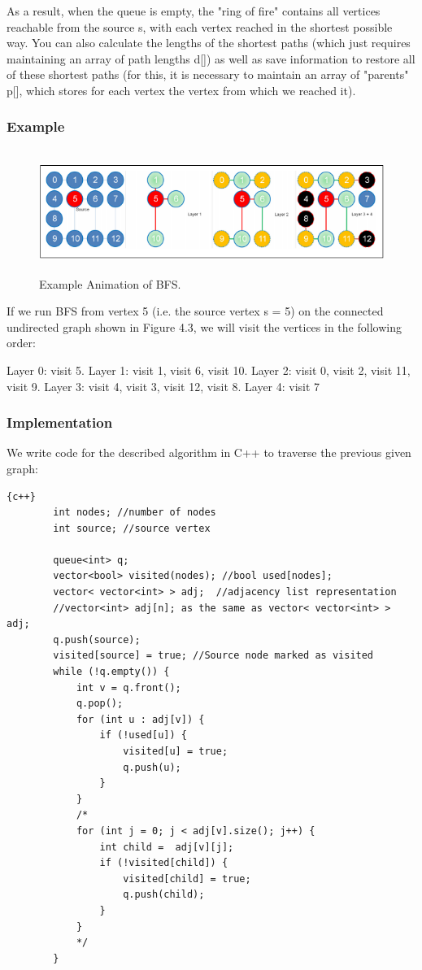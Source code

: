 As a result, when the queue is empty, the "ring of fire" contains all vertices reachable from the source s, with each vertex reached in the shortest possible way. You can also calculate the lengths of the shortest paths (which just requires maintaining an array of path lengths d[]) as well as save information to restore all of these shortest paths (for this, it is necessary to maintain an array of "parents" p[], which stores for each vertex the vertex from which we reached it).   
\subsubsection{Example}
\begin{figure}[h]
    \centering
\includegraphics[width=16cm, height=4cm]{BFS-animation.png}
 \caption{Example Animation of BFS.}
    \label{fig:BFS-animation}
\end{figure}

If we run BFS from vertex 5 (i.e. the source vertex s = 5) on the connected undirected
graph shown in Figure 4.3, we will visit the vertices in the following order:

Layer 0: visit 5. Layer 1: visit 1, visit 6, visit 10. Layer 2: visit 0, visit 2, visit 11, visit 9. Layer 3: visit 4, visit 3, visit 12, visit 8. Layer 4: visit 7

\subsubsection{Implementation}
We write code for the described algorithm in C++ to traverse the previous given graph:
\begin{lstlisting}{c++}
        int nodes; //number of nodes
        int source; //source vertex
        
        queue<int> q;
        vector<bool> visited(nodes); //bool used[nodes]; 
        vector< vector<int> > adj;  //adjacency list representation
        //vector<int> adj[n]; as the same as vector< vector<int> > adj;
        q.push(source);
        visited[source] = true; //Source node marked as visited
        while (!q.empty()) {
            int v = q.front();
            q.pop();
            for (int u : adj[v]) {
                if (!used[u]) {
                    visited[u] = true;
                    q.push(u);
                }
            }
            /*
            for (int j = 0; j < adj[v].size(); j++) {
                int child =  adj[v][j];
                if (!visited[child]) {
                    visited[child] = true;
                    q.push(child);
                }
            }
            */
        }
\end{lstlisting}


